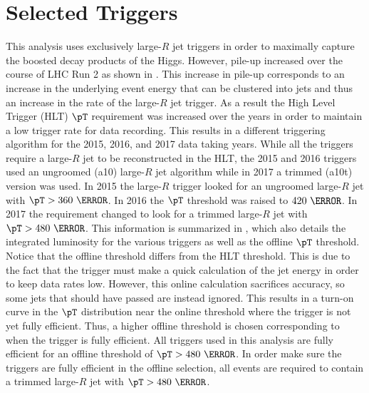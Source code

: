 \section{Selected Triggers} \label{sec:selection:triggers}

This analysis uses exclusively large-$R$ jet triggers in order to maximally
capture the boosted decay products of the Higgs. However, pile-up increased
over the course of LHC Run 2 as shown in . This increase in
pile-up corresponds to an increase in the underlying event energy that can be
clustered into jets and thus an increase in the rate of the large-$R$ jet
trigger. As a result the High Level Trigger (HLT) $\pT$ requirement was
increased over the years in order to maintain a low trigger rate for data
recording.  This results in a different triggering algorithm for the 2015,
2016, and 2017 data taking years.  While all the triggers require a large-$R$
jet to be reconstructed in the HLT, the 2015 and 2016 triggers used an
ungroomed (a10) large-$R$ jet algorithm while in 2017 a trimmed (a10t) version
was used.  In 2015 the large-$R$ trigger looked for an ungroomed large-$R$ jet
with $\pT > 360~\GeV$.  In 2016 the $\pT$ threshold was raised to $420~\GeV$.
In 2017 the requirement changed to look for a trimmed large-$R$ jet with $\pT >
480~\GeV$.  This information is summarized in , which also
details the integrated luminosity for the various triggers as well as the
offline $\pT$ threshold.  Notice that the offline threshold differs from the
HLT threshold.  This is due to the fact that the trigger must make a quick
calculation of the jet energy in order to keep data rates low. However, this
online calculation sacrifices accuracy, so some jets that should have
passed are instead ignored.  This results in a turn-on curve in the $\pT$
distribution near the online threshold where the trigger is not yet fully
efficient. Thus, a higher offline threshold is chosen corresponding to when the
trigger is fully efficient.  All triggers used in this analysis are fully
efficient for an offline threshold of $\pT > 480~\GeV$.  In order make sure the
triggers are fully efficient in the offline selection, all events are required
to contain a trimmed large-$R$ jet with $\pT > 480~\GeV$.

